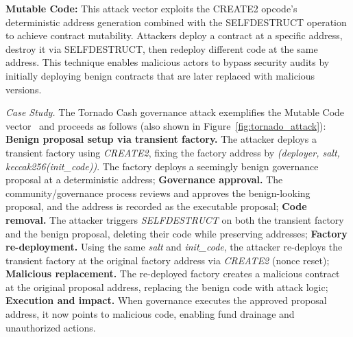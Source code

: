 \documentclass[acmsmall, screen]{acmart}
\begin{document}
	\textbf{Mutable Code:} \label{sec:security-mutablecode} This attack vector exploits the CREATE2
	opcode's deterministic address generation combined with the SELFDESTRUCT operation to achieve
	contract mutability. Attackers deploy a contract at a specific address, destroy it via
	SELFDESTRUCT, then redeploy different code at the same address. This technique enables malicious
	actors to bypass security audits by initially deploying benign contracts that are later replaced
	with malicious versions.

	\textit{Case Study.} The Tornado Cash governance attack exemplifies the Mutable Code vector~\cite{tornado-cash-attack}
	and proceeds as follows (also shown in Figure~\ref{fig:tornado_attack}):  \textbf{Benign
	proposal setup via transient factory.} The attacker deploys a transient factory using \textit{CREATE2},
	fixing the factory address by \textit{(deployer, salt, keccak256(init\_code))}. The factory
	deploys a seemingly benign governance proposal at a deterministic address;  \textbf{Governance
	approval.} The community/governance process reviews and approves the benign-looking proposal,
	and the address is recorded as the executable proposal;  \textbf{Code removal.} The attacker
	triggers \textit{SELFDESTRUCT} on both the transient factory and the benign proposal, deleting their
	code while preserving addresses;  \textbf{Factory re-deployment.} Using the same
	\textit{salt} and \textit{init\_code}, the attacker re-deploys the transient factory at the original
	factory address via \textit{CREATE2} (nonce reset);  \textbf{Malicious replacement.} The
	re-deployed factory creates a malicious contract at the original proposal address, replacing the
	benign code with attack logic;  \textbf{Execution and impact.} When governance executes
	the approved proposal address, it now points to malicious code, enabling fund drainage and unauthorized
	actions.
\end{document}
